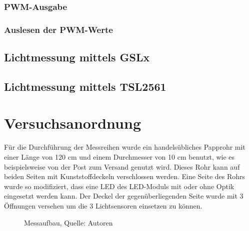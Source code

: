 \documentclass[a4paper,12pt]{scrartcl}
\begin{document}
\subsubsection{PWM-Ausgabe}
\subsubsection{Auslesen der PWM-Werte}
\subsection{Lichtmessung mittels GSLx}
\subsection{Lichtmessung mittels TSL2561}

\clearpage
\section{Versuchsanordnung}
Für die Durchführung der Messreihen wurde ein handelsübliches Papprohr mit
einer Länge von 120 cm und einem Durchmesser von 10 cm benutzt, wie es beispielsweise von der Post zum Versand genutzt wird. Dieses Rohr
kann auf beiden Seiten mit Kunststoffdeckeln verschlossen werden. Eine Seite
des Rohrs wurde so modifiziert, dass eine LED des LED-Moduls mit oder ohne
Optik eingesetzt werden kann. Der Deckel der gegenüberliegenden Seite wurde mit
3 Öffnungen versehen um die 3 Lichtsensoren einsetzen zu können.

\begin{figure}[h] 
  \caption[Messaufbau]{\label{fotohwmessaufbau}Messaufbau, Quelle: Autoren}
\end{figure} 
\end{document}
